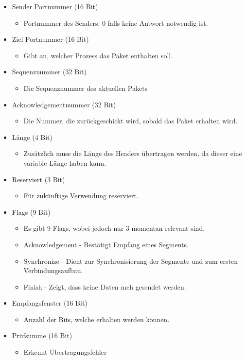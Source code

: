 \documentclass{article}
\begin{document}
	 \begin{itemize}
	 	\item{Sender Portnummer (16 Bit)}
	 	\begin{itemize}
	 		\item{Portnummer des Senders. 0 falls keine Antwort notwendig ist.}
	 	\end{itemize}
	 	\item{Ziel Portnummer (16 Bit)}
	 	\begin{itemize}
	 		\item{Gibt an, welcher Prozess das Paket enthalten soll.}
	 	\end{itemize}
	 	\item{Sequenznummer (32 Bit)}
	 	\begin{itemize}
	 		\item{Die Sequenznummer des aktuellen Pakets}
	 	\end{itemize}
	 	\item{Acknowledgementnummer (32 Bit)}
	 	\begin{itemize}
	 		\item{Die Nummer, die zurückgeschickt wird, sobald das Paket erhalten wird.}
	 	\end{itemize}
	 	\item{Länge (4 Bit)}
	 	\begin{itemize}
	 		\item{Zusätzlich muss die Länge des Headers übertragen werden, da dieser eine variable Länge haben kann.}
	 	\end{itemize}
	 	\item{Reserviert (3 Bit)}
	 	\begin{itemize}
	 		\item{Für zukünftige Verwendung reserviert.}
	 	\end{itemize}
	 	\item{Flags (9 Bit)}
	 	\begin{itemize}
	 		\item{Es gibt 9 Flags, wobei jedoch nur 3 momentan relevant sind.}
	 		\item{Acknowledgement - Bestätigt Empfang eines Segments.}
	 		\item{Synchronize - Dient zur Synchronisierung der Segmente und zum ersten Verbindungsaufbau.}
	 		\item{Finish - Zeigt, dass keine Daten meh gesendet werden.}
	 	\end{itemize}
	 	\item{Empfangsfenster (16 Bit)}
	 	\begin{itemize}
	 		\item{Anzahl der Bits, welche erhalten werden können.}
	 	\end{itemize}
	 	\item{Prüfsumme (16 Bit)}
	 	\begin{itemize}
	 		\item{Erkennt Übertragungsfehler}
	 	\end{itemize}
	 \end{itemize}
\end{document}
